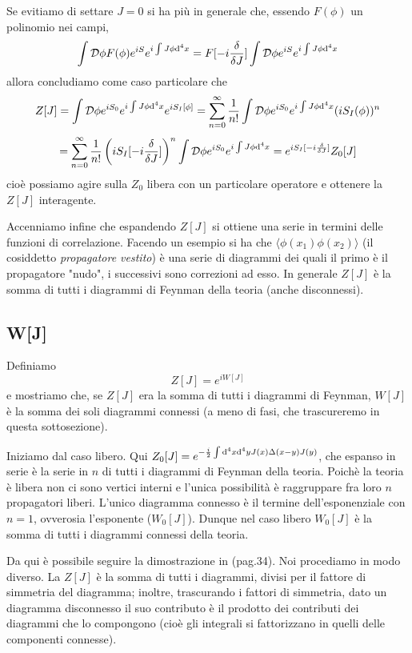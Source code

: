 \documentclass[a4paper, 11pt]{article}
\begin{document}
	Se evitiamo di settare $J=0$ si ha più in generale che, essendo $F(\phi)$ un polinomio nei campi,
	\[ \int \mathcal{D}\phi F(\phi) e^{iS}e^{i\int J\phi \mathrm{d}^4x} = F[-i\frac{\delta}{\delta J}] \int \mathcal{D}\phi e^{iS}e^{i\int J \phi \mathrm{d}^4x} \]
	allora concludiamo come caso particolare che
	\[ Z[J] = \int \mathcal{D}\phi e^{iS_0}e^{i\int J\phi \mathrm{d}^4x} e^{iS_I[\phi]} = \sum_{n=0}^{\infty} \frac{1}{n!} \int \mathcal{D}\phi e^{iS_0}e^{i\int J\phi \mathrm{d}^4x} (iS_I(\phi))^n \]
	\[ = \sum_{n=0}^{\infty} \frac{1}{n!} \left(iS_I[-i\frac{\delta}{\delta J}]\right)^n \int \mathcal{D}\phi e^{iS_0}e^{i\int J\phi \mathrm{d}^4x} = 
	e^{iS_I[-i\frac{\delta}{\delta J}]} Z_0[J] \]
	cioè possiamo agire sulla $Z_0$ libera con un particolare operatore e ottenere la $Z[J]$ interagente.
	
	Accenniamo infine che espandendo $Z[J]$ si ottiene una serie in termini delle funzioni di correlazione. Facendo un esempio si ha che $\langle \phi(x_1) \phi(x_2)\rangle$ (il cosiddetto \emph{propagatore vestito}) è una serie di diagrammi dei quali il primo è il propagatore "nudo", i successivi sono correzioni ad esso. In generale $Z[J]$ è la somma di tutti i diagrammi di Feynman della teoria (anche disconnessi).
	
	\subsection{W[J]}
	Definiamo
	\[ Z[J] = e^{iW{[J]}} \]
	e mostriamo che, se $Z[J]$ era la somma di tutti i diagrammi di Feynman, $W[J]$ è la somma dei soli diagrammi connessi (a meno di fasi, che trascureremo in questa sottosezione).
	
	Iniziamo dal caso libero. Qui $Z_0[J] = e^{-\frac{i}{2}\int \mathrm{d}^4 x \mathrm{d}^4 y J(x)\Delta(x-y)J(y)}$, che espanso in serie è la serie in $n$ di tutti i diagrammi di Feynman della teoria. Poichè la teoria è libera non ci sono vertici interni e l'unica possibilità è raggruppare fra loro $n$ propagatori liberi. L'unico diagramma connesso è il termine dell'esponenziale con $n=1$, ovverosia l'esponente ($W_0[J]$).
	Dunque nel caso libero $W_0[J]$ è la somma di tutti i diagrammi connessi della teoria.
	
	Da qui è possibile seguire la dimostrazione in \cite{anselmi} (pag.34). Noi procediamo in modo diverso. La $Z[J]$ è la somma di tutti i diagrammi, divisi per il fattore di simmetria del diagramma; inoltre, trascurando i fattori di simmetria, dato un diagramma disconnesso il suo contributo è il prodotto dei contributi dei diagrammi che lo compongono (cioè gli integrali si fattorizzano in quelli delle componenti connesse).
	
\end{document}
